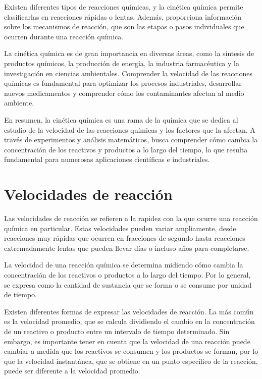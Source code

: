 Existen diferentes tipos de reacciones químicas, y la cinética química permite clasificarlas en reacciones rápidas o lentas. Además, proporciona información sobre los mecanismos de reacción, que son las etapas o pasos individuales que ocurren durante una reacción química.

La cinética química es de gran importancia en diversas áreas, como la síntesis de productos químicos, la producción de energía, la industria farmacéutica y la investigación en ciencias ambientales. Comprender la velocidad de las reacciones químicas es fundamental para optimizar los procesos industriales, desarrollar nuevos medicamentos y comprender cómo los contaminantes afectan al medio ambiente.

En resumen, la cinética química es una rama de la química que se dedica al estudio de la velocidad de las reacciones químicas y los factores que la afectan. A través de experimentos y análisis matemáticos, busca comprender cómo cambia la concentración de los reactivos y productos a lo largo del tiempo, lo que resulta fundamental para numerosas aplicaciones científicas e industriales.

\section{Velocidades de reacción}\label{vreac}
Las velocidades de reacción se refieren a la rapidez con la que ocurre una reacción química en particular. Estas velocidades pueden variar ampliamente, desde reacciones muy rápidas que ocurren en fracciones de segundo hasta reacciones extremadamente lentas que pueden llevar días o incluso años para completarse.

La velocidad de una reacción química se determina midiendo cómo cambia la concentración de los reactivos o productos a lo largo del tiempo. Por lo general, se expresa como la cantidad de sustancia que se forma o se consume por unidad de tiempo.

Existen diferentes formas de expresar las velocidades de reacción. La más común es la velocidad promedio, que se calcula dividiendo el cambio en la concentración de un reactivo o producto entre un intervalo de tiempo determinado. Sin embargo, es importante tener en cuenta que la velocidad de una reacción puede cambiar a medida que los reactivos se consumen y los productos se forman, por lo que la velocidad instantánea, que se obtiene en un punto específico de la reacción, puede ser diferente a la velocidad promedio.


